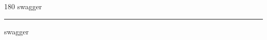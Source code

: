 
\begin{frame}
\begin{center}
\begin{turn}{180}
{\fontsize{2.5cm}{1em}\selectfont swagger}
\end{turn}
\vspace{1em}\par  
\hrule
\vspace{1em}\par  
{\fontsize{2.5cm}{1em}\selectfont swagger}
\end{center}
\end{frame}
